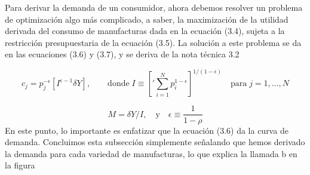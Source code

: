 Para derivar la demanda de un consumidor, ahora debemos resolver un problema de optimización algo más complicado, a saber, la maximización de la utilidad derivada del consumo de manufacturas dada en la ecuación (3.4), sujeta a la restricción presupuestaria de la ecuación (3.5). La solución a este problema se da en las ecuaciones (3.6) y (3.7), y se deriva de la nota técnica 3.2

\begin{equation}
    c_j = p_j^{-\epsilon} \left[I^{\epsilon-1}\delta Y\right], \qquad \mbox{donde}\; I \equiv \left['\sum_{i=1}^N p_i^{1-\epsilon}\right]^{1/(1-\epsilon)} \quad \mbox{para}\; j=1,\ldots,N
\end{equation}

\begin{equation}
    M=\delta Y / I, \quad \mbox{y}\quad \epsilon \equiv \dfrac{1}{1-\rho}
\end{equation}
En este punto, lo importante es enfatizar que la ecuación (3.6) da la curva de demanda. Concluimos esta subsección simplemente señalando que hemos derivado la demanda para cada variedad de manufacturas, lo que explica la llamada b en la figura

